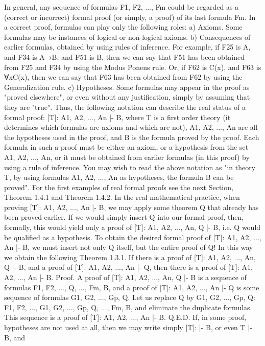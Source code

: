 In general, any sequence of formulas F1, F2, ..., Fm could be regarded as a (correct or incorrect) formal
proof (or simply, a proof) of its last formula Fm. In a correct proof, formulas can play only the following
roles:
a) Axioms. Some formulas may be instances of logical or non-logical axioms.
b) Consequences of earlier formulas, obtained by using rules of inference. For example, if F25 is A, and
F34 is A→B, and F51 is B, then we can say that F51 has been obtained from F25 and F34 by using the
Modus Ponens rule. Or, if F62 is C(x), and F63 is ∀xC(x), then we can say that F63 has been obtained
from F62 by using the Generalization rule.
c) Hypotheses. Some formulas may appear in the proof as "proved elsewhere", or even without any
justification, simply by assuming that they are "true".
Thus, the following notation can describe the real status of a formal proof:
[T]: A1, A2, ..., An |- B,
where T is a first order theory (it determines which formulas are axioms and which are not), A1, A2, ..., An
are all the hypotheses used in the proof, and B is the formula proved by the proof. Each formula in such a
proof must be either an axiom, or a hypothesis from the set A1, A2, ..., An, or it must be obtained from
earlier formulas (in this proof) by using a rule of inference. You may wish to read the above notation as
"in theory T, by using formulas A1, A2, ..., An as hypotheses, the formula B can be proved".
For the first examples of real formal proofs see the next Section, Theorem 1.4.1 and Theorem 1.4.2.
In the real mathematical practice, when proving [T]: A1, A2, ..., An |- B, we may apply some theorem Q
that already has been proved earlier. If we would simply insert Q into our formal proof, then, formally,
this would yield only a proof of [T]: A1, A2, ..., An, Q |- B, i.e. Q would be qualified as a hypothesis. To
obtain the desired formal proof of [T]: A1, A2, ..., An |- B, we must insert not only Q itself, but the entire
proof of Q! In this way we obtain the following
Theorem 1.3.1. If there is a proof of [T]: A1, A2, ..., An, Q |- B, and a proof of [T]: A1, A2, ..., An |- Q,
then there is a proof of [T]: A1, A2, ..., An |- B.
Proof. A proof of [T]: A1, A2, ..., An, Q |- B is a sequence of formulas F1, F2, ..., Q, ..., Fm, B, and a proof
of [T]: A1, A2, ..., An |- Q is some sequence of formulas G1, G2, ..., Gp, Q. Let us replace Q by G1, G2, ...,
Gp, Q:
F1, F2, ..., G1, G2, ..., Gp, Q, ..., Fm, B,
and eliminate the duplicate formulas. This sequence is a proof of [T]: A1, A2, ..., An |- B. Q.E.D.
If, in some proof, hypotheses are not used at all, then we may write simply [T]: |- B, or even T |- B, and
